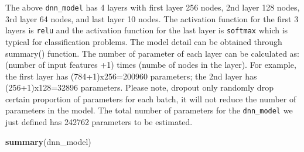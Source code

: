 \documentclass[12pt,]{krantz}
\makeatletter
\newenvironment{Shaded}{\begin{snugshade}}{\end{snugshade}}
\newcommand{\DataTypeTok}[1]{\textcolor[rgb]{0.27,0.27,0.27}{#1}}
\newcommand{\DecValTok}[1]{\textcolor[rgb]{0.06,0.06,0.06}{#1}}
\newcommand{\FloatTok}[1]{\textcolor[rgb]{0.06,0.06,0.06}{#1}}
\newcommand{\KeywordTok}[1]{\textcolor[rgb]{0.27,0.27,0.27}{\textbf{#1}}}
\newcommand{\NormalTok}[1]{#1}
\newcommand{\OperatorTok}[1]{\textcolor[rgb]{0.43,0.43,0.43}{\textbf{#1}}}
\newcommand{\StringTok}[1]{\textcolor[rgb]{0.5,0.5,0.5}{#1}}
\newenvironment{kframe}{%
\medskip{}
\setlength{\fboxsep}{.8em}
 \def\at@end@of@kframe{}%
 \ifinner\ifhmode%
  \def\at@end@of@kframe{\end{minipage}}%
  \begin{minipage}{\columnwidth}%
 \fi\fi%
 \def\FrameCommand##1{\hskip\@totalleftmargin \hskip-\fboxsep
 \colorbox{shadecolor}{##1}\hskip-\fboxsep
     \hskip-\linewidth \hskip-\@totalleftmargin \hskip\columnwidth}%
 \MakeFramed {\advance\hsize-\width
   \@totalleftmargin\z@ \linewidth\hsize
   \@setminipage}}%
 {\par\unskip\endMakeFramed%
 \at@end@of@kframe}
\renewenvironment{Shaded}{\begin{kframe}}{\end{kframe}}
\makeatother
\begin{document}
\begin{Shaded}
\end{Shaded}

The above \texttt{dnn\_model} has 4 layers with first layer 256 nodes, 2nd layer 128 nodes, 3rd layer 64 nodes, and last layer 10 nodes. The activation function for the first 3 layers is \texttt{relu} and the activation function for the last layer is \texttt{softmax} which is typical for classification problems. The model detail can be obtained through summary() function. The number of parameter of each layer can be calculated as: (number of input features +1) times (numbe of nodes in the layer). For example, the first layer has (784+1)x256=200960 parameters; the 2nd layer has (256+1)x128=32896 parameters. Please note, dropout only randomly drop certain proportion of parameters for each batch, it will not reduce the number of parameters in the model. The total number of parameters for the \texttt{dnn\_model} we just defined has 242762 parameters to be estimated.

\begin{Shaded}
\begin{Highlighting}[]
\KeywordTok{summary}\NormalTok{(dnn_model)}
\end{Highlighting}
\end{Shaded}
\end{document}
